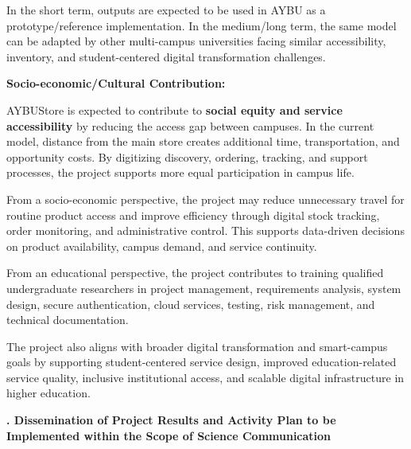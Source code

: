 \documentclass[10pt,a4paper]{article}
\newcommand{\subhead}[1]{\vspace{0.8em}\noindent\textbf{\fontsize{10}{11}\selectfont #1}\par\vspace{0.3em}}
\begin{document}
In the short term, outputs are expected to be used in AYBU as a prototype/reference implementation. In the medium/long term, the same model can be adapted by other multi-campus universities facing similar accessibility, inventory, and student-centered digital transformation challenges.

\textbf{Socio-economic/Cultural Contribution:}

AYBUStore is expected to contribute to \textbf{social equity and service accessibility} by reducing the access gap between campuses. In the current model, distance from the main store creates additional time, transportation, and opportunity costs. By digitizing discovery, ordering, tracking, and support processes, the project supports more equal participation in campus life.

From a socio-economic perspective, the project may reduce unnecessary travel for routine product access and improve efficiency through digital stock tracking, order monitoring, and administrative control. This supports data-driven decisions on product availability, campus demand, and service continuity.

From an educational perspective, the project contributes to training qualified undergraduate researchers in project management, requirements analysis, system design, secure authentication, cloud services, testing, risk management, and technical documentation.

The project also aligns with broader digital transformation and smart-campus goals by supporting student-centered service design, improved education-related service quality, inclusive institutional access, and scalable digital infrastructure in higher education.

\subhead{4.3. Dissemination of Project Results and Activity Plan to be Implemented within the Scope of Science Communication}
\end{document}

